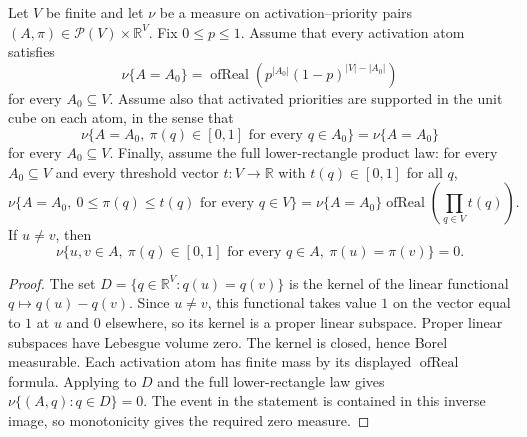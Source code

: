 \begin{helper}
Let \(V\) be finite and let \(\nu\) be a measure on activation--priority
pairs \((A,\pi)\in\mathcal P(V)\times\mathbb R^V\).  Fix
\(0\le p\le1\).  Assume that every activation atom satisfies
\[
\nu\{A=A_0\}=
\operatorname{ofReal}\!\left(p^{|A_0|}(1-p)^{|V|-|A_0|}\right)
\]
for every \(A_0\subseteq V\).  Assume also that activated priorities are
supported in the unit cube on each atom, in the sense that
\[
\nu\{A=A_0,\ \pi(q)\in[0,1]\text{ for every }q\in A_0\}
=\nu\{A=A_0\}
\]
for every \(A_0\subseteq V\).  Finally, assume the full lower-rectangle
product law: for every \(A_0\subseteq V\) and every threshold vector
\(t:V\to\mathbb R\) with \(t(q)\in[0,1]\) for all \(q\),
\[
\nu\{A=A_0,\ 0\le \pi(q)\le t(q)\text{ for every }q\in V\}
=\nu\{A=A_0\}\operatorname{ofReal}\!\left(\prod_{q\in V}t(q)\right).
\]
If \(u\ne v\), then
\[
\nu\{u,v\in A,\ \pi(q)\in[0,1]\text{ for every }q\in A,\ \pi(u)=\pi(v)\}=0 .
\]
\end{helper}
\begin{proof}
The set \(D=\{q\in\mathbb R^V:q(u)=q(v)\}\) is the kernel of the
linear functional \(q\mapsto q(u)-q(v)\).
Since \(u\ne v\), this functional takes value \(1\) on the vector equal
to \(1\) at \(u\) and \(0\) elsewhere, so its kernel is a proper linear
subspace. Proper linear subspaces have Lebesgue volume zero.
The kernel is closed, hence Borel measurable.
Each activation atom has finite mass by its displayed
\(\operatorname{ofReal}\) formula. Applying
 to \(D\) and the full
lower-rectangle law gives \(\nu\{(A,q):q\in D\}=0\).
The event in the statement is contained in this inverse image, so
monotonicity gives the required zero measure.
\end{proof}
